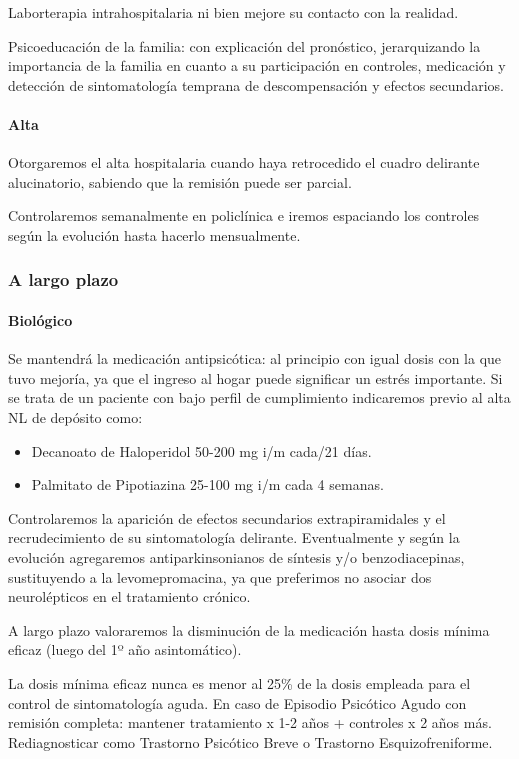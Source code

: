 Laborterapia intrahospitalaria ni bien mejore su contacto con la realidad.

Psicoeducación de la familia: con explicación del pronóstico, jerarquizando la importancia de la familia en cuanto a su participación en controles, medicación y detección de sintomatología temprana de descompensación y efectos secundarios.
\paragraph*{Alta}
Otorgaremos el alta hospitalaria cuando haya retrocedido el cuadro delirante alucinatorio, sabiendo que la remisión puede ser parcial.

Controlaremos semanalmente en policlínica e iremos espaciando los controles según la evolución hasta hacerlo mensualmente.

\subsubsection*{A largo plazo}
\paragraph*{Biológico}
Se mantendrá la medicación antipsicótica\cite{ostuzzi2022preventing}: al principio con igual dosis con la que tuvo mejoría, ya que el ingreso al hogar puede significar un estrés importante. Si se trata de un paciente con bajo perfil de cumplimiento indicaremos previo al alta NL de depósito como:
\begin{itemize}
    \item Decanoato de Haloperidol 50-200 mg i/m cada/21 días.
    \item Palmitato de Pipotiazina 25-100 mg i/m cada 4 semanas.
\end{itemize}
Controlaremos la aparición de efectos secundarios extrapiramidales y el recrudecimiento de su sintomatología delirante. Eventualmente y según la evolución agregaremos antiparkinsonianos de síntesis y/o benzodiacepinas, sustituyendo a la levomepromacina, ya que preferimos no asociar dos neurolépticos en el tratamiento crónico.

A largo plazo valoraremos la disminución de la medicación hasta dosis mínima eficaz (luego del 1º año asintomático).

La dosis mínima eficaz nunca es menor al 25\% de la dosis empleada para el control de sintomatología aguda. En caso de Episodio Psicótico Agudo con remisión completa: mantener tratamiento x 1-2 años + controles x 2 años más. Rediagnosticar como Trastorno Psicótico Breve o Trastorno Esquizofreniforme.

